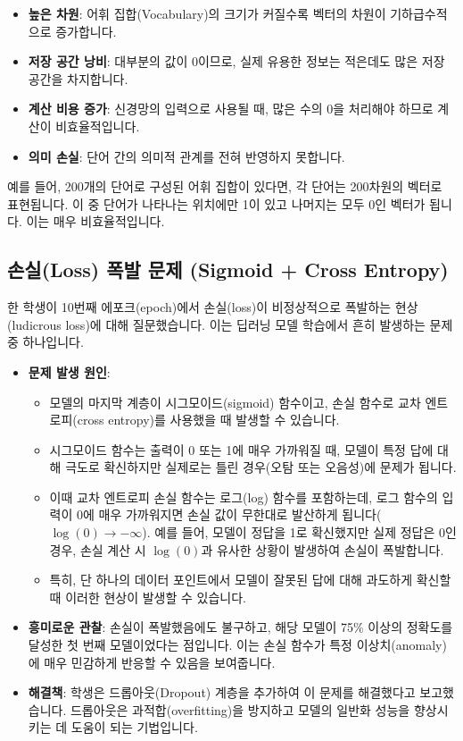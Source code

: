 \documentclass[11pt,a4paper]{article}
\theoremstyle{definition}
\begin{document}
\begin{itemize}
    \item \textbf{높은 차원}: 어휘 집합(Vocabulary)의 크기가 커질수록 벡터의 차원이 기하급수적으로 증가합니다.
    \item \textbf{저장 공간 낭비}: 대부분의 값이 0이므로, 실제 유용한 정보는 적은데도 많은 저장 공간을 차지합니다.
    \item \textbf{계산 비용 증가}: 신경망의 입력으로 사용될 때, 많은 수의 0을 처리해야 하므로 계산이 비효율적입니다.
    \item \textbf{의미 손실}: 단어 간의 의미적 관계를 전혀 반영하지 못합니다.
\end{itemize}

\begin{tcolorbox}[examplebox, title=\textbf{예시}]
예를 들어, 200개의 단어로 구성된 어휘 집합이 있다면, 각 단어는 200차원의 벡터로 표현됩니다. 이 중 단어가 나타나는 위치에만 1이 있고 나머지는 모두 0인 벡터가 됩니다. 이는 매우 비효율적입니다.
\end{tcolorbox}

\subsection{손실(Loss) 폭발 문제 (Sigmoid + Cross Entropy)}

한 학생이 10번째 에포크(epoch)에서 손실(loss)이 비정상적으로 폭발하는 현상(ludicrous loss)에 대해 질문했습니다. 이는 딥러닝 모델 학습에서 흔히 발생하는 문제 중 하나입니다.

\begin{itemize}
    \item \textbf{문제 발생 원인}:
        \begin{itemize}
            \item 모델의 마지막 계층이 시그모이드(sigmoid) 함수이고, 손실 함수로 교차 엔트로피(cross entropy)를 사용했을 때 발생할 수 있습니다.
            \item 시그모이드 함수는 출력이 0 또는 1에 매우 가까워질 때, 모델이 특정 답에 대해 극도로 확신하지만 실제로는 틀린 경우(오탐 또는 오음성)에 문제가 됩니다.
            \item 이때 교차 엔트로피 손실 함수는 로그(log) 함수를 포함하는데, 로그 함수의 입력이 0에 매우 가까워지면 손실 값이 무한대로 발산하게 됩니다($\log(0) \rightarrow -\infty$). 예를 들어, 모델이 정답을 1로 확신했지만 실제 정답은 0인 경우, 손실 계산 시 $\log(0)$과 유사한 상황이 발생하여 손실이 폭발합니다.
            \item 특히, 단 하나의 데이터 포인트에서 모델이 잘못된 답에 대해 과도하게 확신할 때 이러한 현상이 발생할 수 있습니다.
        \end{itemize}
    \item \textbf{흥미로운 관찰}: 손실이 폭발했음에도 불구하고, 해당 모델이 75\% 이상의 정확도를 달성한 첫 번째 모델이었다는 점입니다. 이는 손실 함수가 특정 이상치(anomaly)에 매우 민감하게 반응할 수 있음을 보여줍니다.
    \item \textbf{해결책}: 학생은 드롭아웃(Dropout) 계층을 추가하여 이 문제를 해결했다고 보고했습니다. 드롭아웃은 과적합(overfitting)을 방지하고 모델의 일반화 성능을 향상시키는 데 도움이 되는 기법입니다.
\end{itemize}
\end{document}
